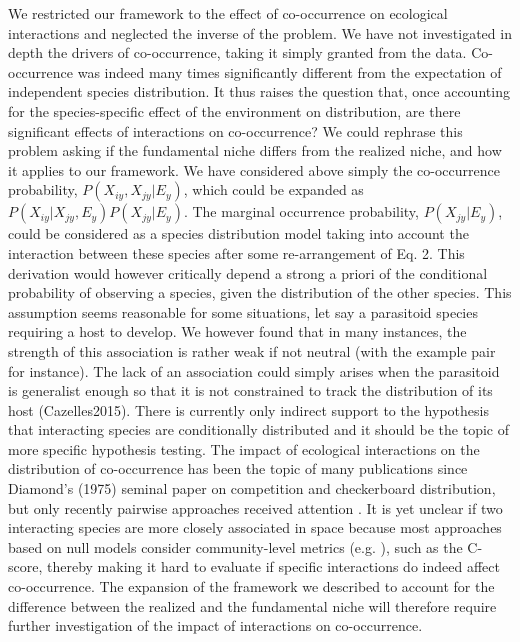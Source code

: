 \documentclass[12pt]{article}
\begin{document}
We restricted our framework to the effect of co-occurrence on ecological
interactions and neglected the inverse of the problem. We have not
investigated in depth the drivers of co-occurrence, taking it simply granted
from the data. Co-occurrence was indeed many times significantly different
from the expectation of independent species distribution. It thus raises the
question that, once accounting for the species-specific effect of the
environment on distribution, are there significant effects of interactions on
co-occurrence? We could rephrase this problem asking if the fundamental niche
differs from the realized niche, and how it applies to our framework. We have
considered above simply the co-occurrence probability, $P(X_{iy},X_{jy}|E_y)$,
which could be expanded as  $P(X_{iy}|X_{jy},E_y) P(X_{jy}| E_y )$. The
marginal occurrence probability, $P(X_{jy}| E_y )$, could be considered as a
species distribution model taking into account the interaction between these
species after some re-arrangement of Eq. 2. This derivation would however
critically depend a strong a priori of the conditional probability of
observing a species, given the distribution of the other species. This
assumption seems reasonable for some situations, let say a parasitoid species
requiring a host to develop. We however found that in many instances, the
strength of this association is rather weak if not neutral (with the example
pair for instance). The lack of an association could simply arises when the
parasitoid is generalist enough so that it is not constrained to track the
distribution of its host (Cazelles2015). There is currently only indirect
support to the hypothesis that interacting species are conditionally
distributed and it should be the topic of more specific hypothesis testing.
The impact of ecological interactions on the distribution of co-occurrence has
been the topic of many publications since Diamond's (1975) seminal paper on
competition and checkerboard distribution, but only recently pairwise
approaches received attention \citep{Veech2013}. It is yet unclear if two
interacting species are more closely associated in space because most
approaches based on null models consider community-level metrics (e.g.
\citep{Gotelli2000}), such as the C-score, thereby making it hard to evaluate if
specific interactions do indeed affect co-occurrence. The expansion of the
framework we described to account for the difference between the realized and
the fundamental niche will therefore require further investigation of the
impact of interactions on co-occurrence.
\end{document}
